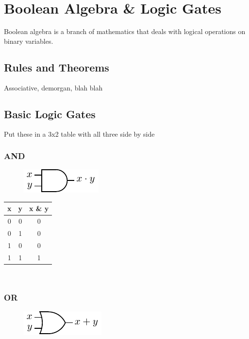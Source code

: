 \chapter{Boolean Algebra \& Logic Gates}

Boolean algebra is a branch of mathematics that deals with logical operations on binary variables.

\section{Rules and Theorems}

Associative, demorgan, blah blah

\section{Basic Logic Gates}

Put these in a 3x2 table with all three side by side

\subsection{AND}

\begin{figure}[h!]
	\includegraphics{./img/and.png}
\end{figure}

\begin{tabular}{c c c}
	\hline
	\textbf{x} & \textbf{y} & \textbf{x \& y} \\ 
	\hline
	0 & 0 & 0 \\
	0 & 1 & 0 \\
	1 & 0 & 0 \\
	1 & 1 & 1 \\
	\hline 
\end{tabular} \\

\subsection{OR}

\begin{figure}[h!]
	\includegraphics{./img/or.png}
\end{figure}


